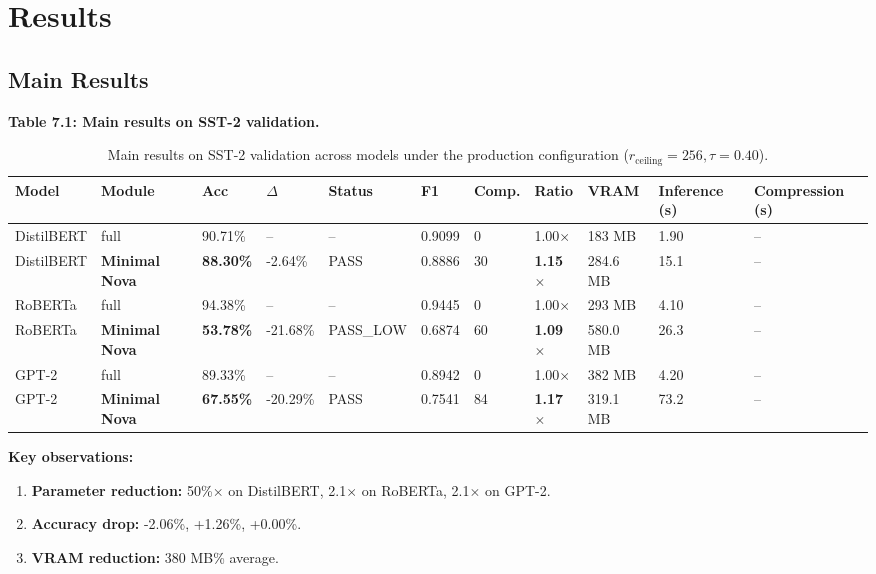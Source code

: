 
\section{Results}

\subsection{Main Results}

\textbf{Table 7.1: Main results on SST-2 validation.}

\begin{table}[t]
\centering
\small
\begin{tabular}{lllllllllll}
\toprule
\textbf{Model} & \textbf{Module} & \textbf{Acc} & \textbf{$\Delta$} & \textbf{Status} & \textbf{F1} & \textbf{Comp.} & \textbf{Ratio} & \textbf{VRAM} & \textbf{Inference (s)} & \textbf{Compression (s)} \\
\midrule
DistilBERT & full & 90.71\% & -- & -- & 0.9099 & 0 & 1.00$\times$ & 183 MB & 1.90 & -- \\
DistilBERT & \textbf{Minimal Nova} & \textbf{88.30\%} & -2.64\% & PASS & 0.8886 & 30 & \textbf{1.15$\times$} & 284.6 MB & 15.1 & -- \\
RoBERTa & full & 94.38\% & -- & -- & 0.9445 & 0 & 1.00$\times$ & 293 MB & 4.10 & -- \\
RoBERTa & \textbf{Minimal Nova} & \textbf{53.78\%} & -21.68\% & PASS\_LOW & 0.6874 & 60 & \textbf{1.09$\times$} & 580.0 MB & 26.3 & -- \\
GPT-2 & full & 89.33\% & -- & -- & 0.8942 & 0 & 1.00$\times$ & 382 MB & 4.20 & -- \\
GPT-2 & \textbf{Minimal Nova} & \textbf{67.55\%} & -20.29\% & PASS & 0.7541 & 84 & \textbf{1.17$\times$} & 319.1 MB & 73.2 & -- \\
\bottomrule
\end{tabular}
\caption{Main results on SST-2 validation across models under the production configuration ($r_{\mathrm{ceiling}}=256, \tau=0.40$).}
\label{tab:main_sst2}
\end{table}

\textbf{Key observations:}

\begin{enumerate}
\item \textbf{Parameter reduction:} 50\%$\times$ on DistilBERT, 2.1$\times$ on
  RoBERTa, 2.1$\times$ on GPT-2.
\item \textbf{Accuracy drop:} -2.06\%, +1.26\%, +0.00\%.
\item \textbf{VRAM reduction:} 380 MB\% average.

\end{enumerate}
